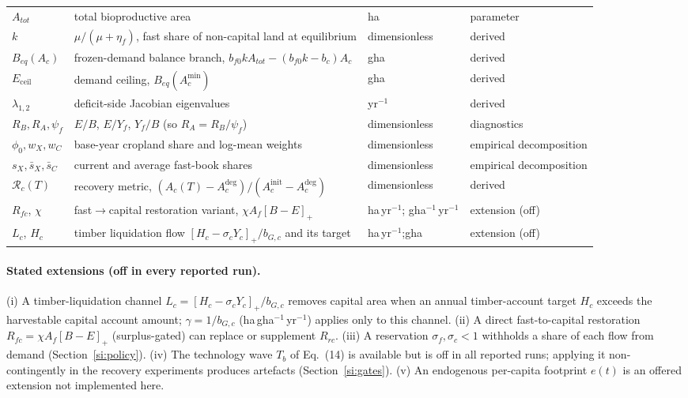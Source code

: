 \documentclass[11pt,a4paper]{article}
\newcommand{\pos}[1]{\left[#1\right]_+}
\newcommand{\Eceil}{E_{\mathrm{ceil}}}
\newcommand{\Acmin}{A_c^{\min}}
\begin{document}
\begin{longtable}{>{\raggedright\arraybackslash}p{}>{\raggedright\arraybackslash}p{}>{\raggedright\arraybackslash}p{}>{\raggedright\arraybackslash}p{}}
$A_{tot}$ & total bioproductive area & ha & parameter \\
$k$ & $\mu/(\mu+\eta_f)$, fast share of non-capital land at equilibrium & dimensionless & derived \\
$B_{eq}(A_c)$ & frozen-demand balance branch, $b_{f0}kA_{tot}-(b_{f0}k-b_c)A_c$ & gha & derived \\
$\Eceil$ & demand ceiling, $B_{eq}(\Acmin)$ & gha & derived \\
$\lambda_{1,2}$ & deficit-side Jacobian eigenvalues & yr$^{-1}$ & derived \\
$R_B,R_A,\psi_f$ & $E/B$, $E/Y_f$, $Y_f/B$ (so $R_A=R_B/\psi_f$) & dimensionless & diagnostics \\
$\phi_0,w_X,w_C$ & base-year cropland share and log-mean weights & dimensionless & empirical decomposition \\
$s_X,\bar s_X,\bar s_C$ & current and average fast-book shares & dimensionless & empirical decomposition \\
$\mathcal R_c(T)$ & recovery metric, $(A_c(T)-A_c^{\mathrm{deg}})/(A_c^{\mathrm{init}}-A_c^{\mathrm{deg}})$ & dimensionless & derived \\
$R_{fc}$, $\chi$ & fast$\to$capital restoration variant, $\chi A_f\pos{B-E}$ & ha\,yr$^{-1}$; gha$^{-1}$\,yr$^{-1}$ & extension (off) \\
$L_c$, $H_c$ & timber liquidation flow $\pos{H_c-\sigma_cY_c}/b_{G,c}$ and its target & ha\,yr$^{-1}$;\newline gha & extension (off) \\
\bottomrule
\end{longtable}

\paragraph{Stated extensions (off in every reported run).} (i) A timber-liquidation channel $L_c=\pos{H_c-\sigma_cY_c}/b_{G,c}$ removes capital area when an annual timber-account target $H_c$ exceeds the harvestable capital account amount; $\gamma=1/b_{G,c}$ (ha\,gha$^{-1}$\,yr$^{-1}$) applies only to this channel. (ii) A direct fast-to-capital restoration $R_{fc}=\chi A_f\pos{B-E}$ (surplus-gated) can replace or supplement $R_{rc}$. (iii) A reservation $\sigma_f,\sigma_c<1$ withholds a share of each flow from demand (Section~\ref{si:policy}). (iv) The technology wave $T_b$ of Eq.~(14) is available but is off in all reported runs; applying it non-contingently in the recovery experiments produces artefacts (Section~\ref{si:gates}). (v) An endogenous per-capita footprint $e(t)$ is an offered extension not implemented here.
\end{document}

